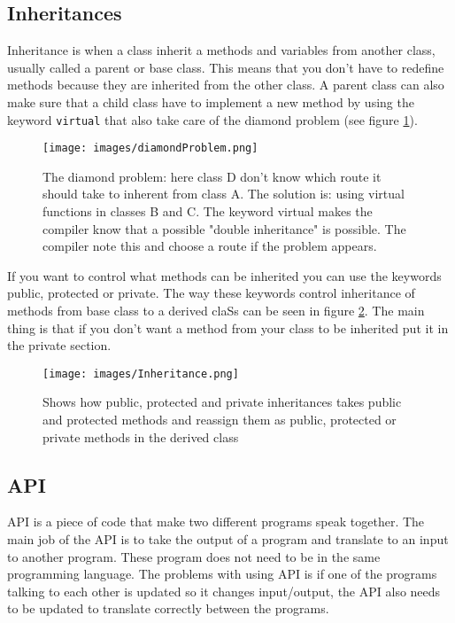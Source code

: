     \subsection{Inheritances}
    Inheritance is when a class inherit a methods and variables from another class, usually called a parent or base class. This means that you don't have to redefine methods because they are inherited from the other class. A parent class can also make sure that a child class have to implement a new method by using the keyword \texttt{virtual} that also take care of the diamond problem (see figure \ref{fig:Diamond problem}).
    \begin{figure}
        \centering
        \texttt{[image: images/diamondProblem.png]}
        \caption{The diamond problem: here class D don't know which route it should take to inherent from class A. The solution is: using virtual functions in classes B and C. The keyword virtual makes the compiler know that a possible "double inheritance" is possible. The compiler note this and choose a route if the problem appears.}
        \label{fig:Diamond problem}
    \end{figure} 
    If you want to control what methods can be inherited you can use the keywords public, protected or private. The way these keywords control inheritance of methods from base class to a derived claSs can be seen in figure \ref{fig:inheritance}. The main thing is that if you don't want a method from your class to be inherited put it in the private section.
    \begin{figure}
        \centering
        \texttt{[image: images/Inheritance.png]}
        \caption{Shows how public, protected and private inheritances takes public and protected methods and reassign them as public, protected or private methods in the derived class}
        \label{fig:inheritance}
    \end{figure}
    
    \subsection{API}
    API is a piece of code that make two different programs speak together. The main job of the API is to take the output of a program and translate to an input to another program. These program does not need to be in the same programming language. The problems with using API is if one of the programs talking to each other is updated so it changes input/output, the API also needs to be updated to translate correctly between the programs.
    
